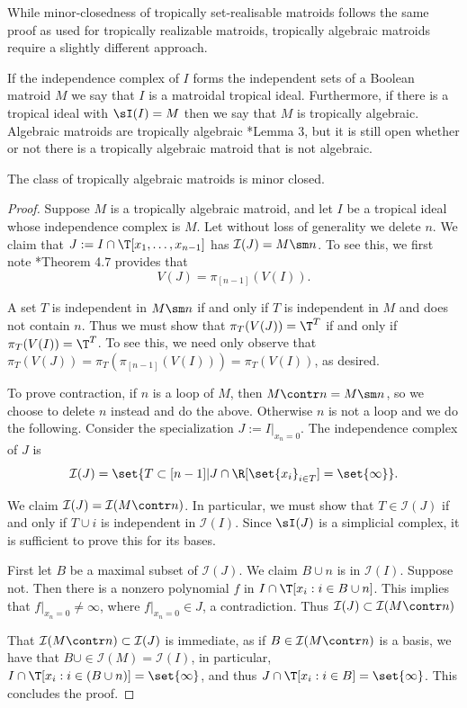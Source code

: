 While minor-closedness of tropically set-realisable matroids follows the same proof as used for tropically realizable matroids, tropically algebraic matroids require a slightly different approach.

If the independence complex of $I$ forms the independent sets of a Boolean matroid $M$ we say that $I$ is a matroidal tropical ideal. Furthermore, if there is a tropical ideal with $\sI(I)=M$ then we say that $M$ is tropically algebraic. Algebraic matroids are tropically algebraic \cite{Yu17}*{Lemma 3}, but it is still open whether or not there is a tropically algebraic matroid that is not algebraic.

\begin{proposition}\label{prop:algMinorClosed}
The class of tropically algebraic matroids is minor closed.
\end{proposition}
\begin{proof}
Suppose $M$ is a tropically algebraic matroid, and let $I$ be a tropical ideal whose independence complex is $M$. Let without loss of generality we delete $n$. We claim that $J:=I\cap \T[x_1,\dots,x_{n-1}]$ has $\mathcal I(J) = M\sm n$. To see this, we first note \cite{MR20}*{Theorem 4.7} provides that
$$V(J)= \pi_{[n-1]}(V(I)).$$

A set $T$ is independent in $M\sm n$ if and only if $T$ is independent in $M$ and does not contain $n$. Thus we must show that $\pi_T(V(J))=\T^T$ if and only if $\pi_T(V(I))=\T^T$. To see this, we need only observe that $\pi_T(V(J))=\pi_T(\pi_{[n-1]}(V(I)))=\pi_T(V(I))$, as desired.

To prove contraction, if $n$ is a loop of $M$, then $M\contr n =M\sm n$, so we choose to delete $n$ instead and do the above. Otherwise $n$ is not a loop and we do the following. Consider the specialization $J:= I|_{x_n=0}$. The independence complex of $J$ is 
$$\mathcal I(J) = \set{T\subset [n-1] | J \cap \R[\set{x_i}_{i\in T}] = \set{\infty}}.$$

We claim $\mathcal I(J) = \mathcal I(M\contr n)$. In particular, we must show that $T\in \mathcal I(J)$ if and only if $T\cup i$ is independent in $\mathcal I(I)$. Since $\sI(J)$ is a simplicial complex, it is sufficient to prove this for its bases.


First let $B$ be a maximal subset of $\mathcal I(J)$. We claim $B\cup n$ is in $\mathcal I(I)$. Suppose not. Then there is a nonzero polynomial $f$ in $I\cap \T[x_i: i \in B\cup n]$. This implies that $f|_{x_n=0}\neq \infty$, where $f|_{x_n=0}\in J$, a contradiction. Thus $\mathcal I(J)\subset \mathcal I(M\contr n)$

That $\mathcal I(M\contr n)\subset \mathcal I(J)$ is immediate, as if $B\in \mathcal I(M\contr n)$ is a basis, we have that $B\cup \in \mathcal I(M)=\mathcal I(I)$, in particular, $I\cap \T[x_i: i\in (B\cup n)]=\set{\infty}$, and thus $J\cap \T[x_i: i\in B]=\set{\infty}$. This concludes the proof.
\end{proof}

